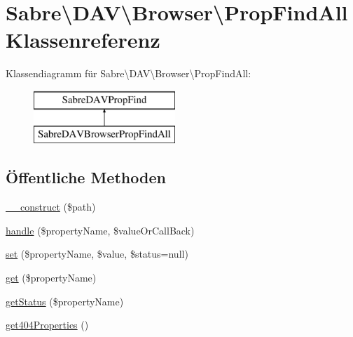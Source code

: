 \hypertarget{class_sabre_1_1_d_a_v_1_1_browser_1_1_prop_find_all}{}\section{Sabre\textbackslash{}D\+AV\textbackslash{}Browser\textbackslash{}Prop\+Find\+All Klassenreferenz}
\label{class_sabre_1_1_d_a_v_1_1_browser_1_1_prop_find_all}
Klassendiagramm für Sabre\textbackslash{}D\+AV\textbackslash{}Browser\textbackslash{}Prop\+Find\+All\+:\begin{figure}[H]
\begin{center}
\leavevmode
\includegraphics[height=2.000000cm]{class_sabre_1_1_d_a_v_1_1_browser_1_1_prop_find_all}
\end{center}
\end{figure}
\subsection*{Öffentliche Methoden}
\begin{DoxyCompactItemize}
\item 
\mbox{\hyperlink{class_sabre_1_1_d_a_v_1_1_browser_1_1_prop_find_all_aae65b337241a6dd73ef6fc824cb2d500}{\+\_\+\+\_\+construct}} (\$path)
\item 
\mbox{\hyperlink{class_sabre_1_1_d_a_v_1_1_browser_1_1_prop_find_all_a32d7b8c6ac9aa925246a832a7b55ee6f}{handle}} (\$property\+Name, \$value\+Or\+Call\+Back)
\item 
\mbox{\hyperlink{class_sabre_1_1_d_a_v_1_1_browser_1_1_prop_find_all_a749706bbd940cdc4e4bb17584c80c680}{set}} (\$property\+Name, \$value, \$status=null)
\item 
\mbox{\hyperlink{class_sabre_1_1_d_a_v_1_1_browser_1_1_prop_find_all_abc74f8633e1a5b9771369e2f29dc4ba9}{get}} (\$property\+Name)
\item 
\mbox{\hyperlink{class_sabre_1_1_d_a_v_1_1_browser_1_1_prop_find_all_acb25b90d455930d4b7dd4045a27ee895}{get\+Status}} (\$property\+Name)
\item 
\mbox{\hyperlink{class_sabre_1_1_d_a_v_1_1_browser_1_1_prop_find_all_a6fce0ea649983d37cb264293de7e8bc7}{get404\+Properties}} ()
\end{DoxyCompactItemize}
